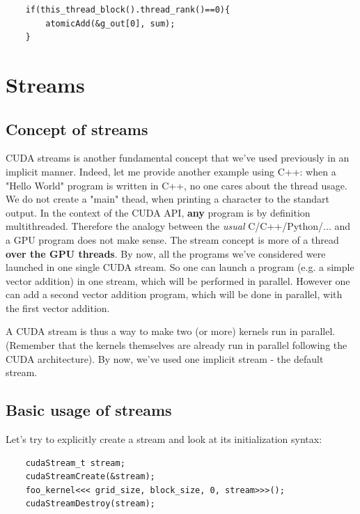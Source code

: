 \begin{verbatim}
    if(this_thread_block().thread_rank()==0){
        atomicAdd(&g_out[0], sum);
    }
\end{verbatim}


\section{Streams}
\label{sec:streams}
\subsection{Concept of streams}
CUDA streams is another fundamental concept that we've used previously in an implicit manner.
Indeed, let me provide another example using C++: when a "Hello World" program is written in C++, 
no one cares about the thread usage. We do not create a "main" thead, when printing a character to 
the standart output. In the context of the CUDA API, \textbf{any} program is by definition multithreaded. 
Therefore the analogy between the \textit{usual} C/C++/Python/... and a GPU program does not make sense.
The stream concept is more of a thread \textbf{over the GPU threads}. 
By now, all the programs we've considered were launched in one single CUDA stream. So one can launch a 
program (e.g. a simple vector addition) in one stream, which will be performed in parallel. However one can 
add a second vector addition program, which will be done in parallel, with the first vector addition.



A CUDA stream is thus a way to make two (or more) kernels run in parallel. (Remember that the kernels 
themselves are already run in parallel following the CUDA architecture). By now, we've used one implicit stream - the default stream.

\subsection{Basic usage of streams}
Let's try to explicitly create a stream and look at its initialization syntax:

\begin{listing}[ht!]
\begin{verbatim}
    cudaStream_t stream;
    cudaStreamCreate(&stream);
    foo_kernel<<< grid_size, block_size, 0, stream>>>();
    cudaStreamDestroy(stream);
\end{verbatim}
\end{listing}

